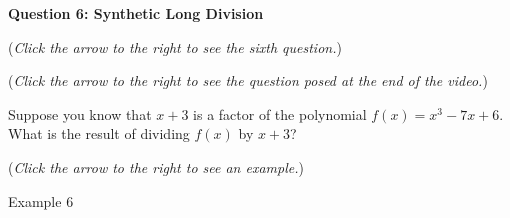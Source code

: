 \documentclass{ximera}
\begin{document}
\textbf{Question 6: Synthetic Long Division}
\begin{question}
\begin{flushright}
{\color{blue}(\emph{Click the arrow to the right to see the sixth question.})}
\end{flushright}
\begin{center}
\begin{expandable}
{\color{blue}(\emph{Click the arrow to the right to see the  question
posed at the end of the video.})}
\begin{expandable}
Suppose you know that $x+3$ is a factor of the polynomial $f(x) = x^3 - 7x + 6$. What is the result of dividing $f(x)$ by $x+3$?
\begin{multipleChoice}
\end{multipleChoice}
\begin{flushright}
{\color{blue}(\emph{Click the arrow to the right to see an example.})}
\end{flushright}
\begin{expandable}
Example 6
\end{expandable}
\end{expandable}
\end{expandable}
\end{center}
\end{question}
\end{document}
